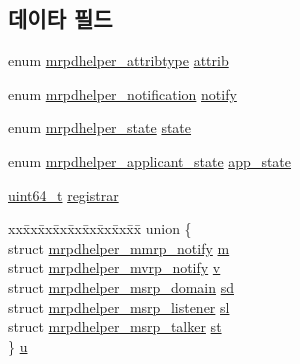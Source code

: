 \subsection*{데이타 필드}
\begin{DoxyCompactItemize}
\item 
enum \hyperlink{mrpdhelper_8h_a3c820aa08e5862ea1531c48ad291bf30}{mrpdhelper\+\_\+attribtype} \hyperlink{structmrpdhelper__notify_a8bdec45795e4be55851ca7772648a776}{attrib}
\item 
enum \hyperlink{mrpdhelper_8h_ac22a7c89c57bb674d40d996df5fad537}{mrpdhelper\+\_\+notification} \hyperlink{structmrpdhelper__notify_a294b813b26e03fb12eb8d27538996d81}{notify}
\item 
enum \hyperlink{mrpdhelper_8h_a831e68c469649bb1445e17810f187e12}{mrpdhelper\+\_\+state} \hyperlink{structmrpdhelper__notify_ab6df4baa55ddd38e0c9a7dba60b483a9}{state}
\item 
enum \hyperlink{mrpdhelper_8h_aa30602e7d8b3a7e3abf38950d4357baa}{mrpdhelper\+\_\+applicant\+\_\+state} \hyperlink{structmrpdhelper__notify_a35bac155de3294018f4a40e52c9ae0c5}{app\+\_\+state}
\item 
\hyperlink{parse_8c_aec6fcb673ff035718c238c8c9d544c47}{uint64\+\_\+t} \hyperlink{structmrpdhelper__notify_acb8e6c800425979d17b2c627be3677f3}{registrar}
\item 
\begin{tabbing}
xx\=xx\=xx\=xx\=xx\=xx\=xx\=xx\=xx\=\kill
union \{\\
\>struct \hyperlink{structmrpdhelper__mmrp__notify}{mrpdhelper\_mmrp\_notify} \hyperlink{structmrpdhelper__notify_a519933d54b2802a4e411e6f33f075e8e}{m}\\
\>struct \hyperlink{structmrpdhelper__mvrp__notify}{mrpdhelper\_mvrp\_notify} \hyperlink{structmrpdhelper__notify_a30cbacfa205024f30ed4c9faf8159e9d}{v}\\
\>struct \hyperlink{structmrpdhelper__msrp__domain}{mrpdhelper\_msrp\_domain} \hyperlink{structmrpdhelper__notify_aff24770d46ca745a8f18555b3e052443}{sd}\\
\>struct \hyperlink{structmrpdhelper__msrp__listener}{mrpdhelper\_msrp\_listener} \hyperlink{structmrpdhelper__notify_aafc64a8fae35512881b906274c8248df}{sl}\\
\>struct \hyperlink{structmrpdhelper__msrp__talker}{mrpdhelper\_msrp\_talker} \hyperlink{structmrpdhelper__notify_a209998708bfd4abd147e5baf834dfb1d}{st}\\
\} \hyperlink{structmrpdhelper__notify_aed8d5758c73f0f41798e9f733639b060}{u}\\

\end{tabbing}\end{DoxyCompactItemize}


